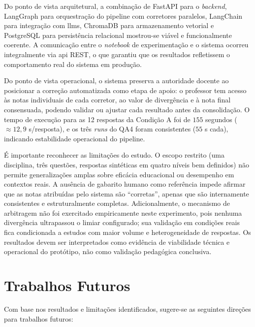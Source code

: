 Do ponto de vista arquitetural, a combinação de FastAPI para o \textit{backend}, LangGraph para orquestração do pipeline com corretores paralelos, LangChain para integração com \gls{llm}s, ChromaDB para armazenamento vetorial e PostgreSQL para persistência relacional mostrou-se viável e funcionalmente coerente. A comunicação entre o \textit{notebook} de experimentação e o sistema ocorreu integralmente via \gls{api} REST, o que garantiu que os resultados refletissem o comportamento real do sistema em produção.

Do ponto de vista operacional, o sistema preserva a autoridade docente ao posicionar a correção automatizada como etapa de apoio: o professor tem acesso às notas individuais de cada corretor, ao valor de divergência e à nota final consensuada, podendo validar ou ajustar cada resultado antes da consolidação. O tempo de execução para as 12 respostas da Condição A foi de $155$ segundos ($\approx 12{,}9$ s/resposta), e os três \textit{runs} do QA4 foram consistentes ($55$ s cada), indicando estabilidade operacional do pipeline.

É importante reconhecer as limitações do estudo. O escopo restrito (uma disciplina, três questões, respostas sintéticas em quatro níveis bem definidos) não permite generalizações amplas sobre eficácia educacional ou desempenho em contextos reais. A ausência de gabarito humano como referência impede afirmar que as notas atribuídas pelo sistema são ``corretas'', apenas que são internamente consistentes e estruturalmente completas. Adicionalmente, o mecanismo de arbitragem não foi exercitado empiricamente neste experimento, pois nenhuma divergência ultrapassou o limiar configurado; sua validação em condições reais fica condicionada a estudos com maior volume e heterogeneidade de respostas. Os resultados devem ser interpretados como evidência de viabilidade técnica e operacional do protótipo, não como validação pedagógica conclusiva.

\section{Trabalhos Futuros}

Com base nos resultados e limitações identificados, sugere-se as seguintes direções para trabalhos futuros:

